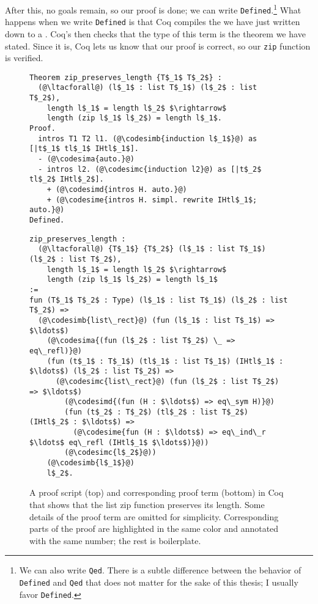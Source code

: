 After this, no goals remain, so our proof is done; we can write \lstinline{Defined}.\footnote{We can also write \lstinline{Qed}. There is a subtle
difference between the behavior of \lstinline{Defined} and \lstinline{Qed} that does not matter for the sake of this thesis; I usually favor \lstinline{Defined}.}
What happens when we write \lstinline{Defined} is that Coq compiles the  we have just written down to a .
Coq's  then checks that the type of this term is the theorem we have stated.
Since it is, Coq lets us know that our proof is correct, so our \lstinline{zip} function is verified.

\begin{figure}
\begin{lstlisting}
Theorem zip_preserves_length {T$_1$ T$_2$} :
  (@\ltacforall@) (l$_1$ : list T$_1$) (l$_2$ : list T$_2$),
    length l$_1$ = length l$_2$ $\rightarrow$
    length (zip l$_1$ l$_2$) = length l$_1$.
Proof.
  intros T1 T2 l1. (@\codesimb{induction l$_1$}@) as [|t$_1$ tl$_1$ IHtl$_1$].
  - (@\codesima{auto.}@)
  - intros l2. (@\codesimc{induction l2}@) as [|t$_2$ tl$_2$ IHtl$_2$].
    + (@\codesimd{intros H. auto.}@)
    + (@\codesime{intros H. simpl. rewrite IHtl$_1$; auto.}@)
Defined.
\end{lstlisting}
\begin{lstlisting}
zip_preserves_length :
  (@\ltacforall@) {T$_1$} {T$_2$} (l$_1$ : list T$_1$) (l$_2$ : list T$_2$),
    length l$_1$ = length l$_2$ $\rightarrow$
    length (zip l$_1$ l$_2$) = length l$_1$
:=
fun (T$_1$ T$_2$ : Type) (l$_1$ : list T$_1$) (l$_2$ : list T$_2$) =>
  (@\codesimb{list\_rect}@) (fun (l$_1$ : list T$_1$) => $\ldots$)
    (@\codesima{(fun (l$_2$ : list T$_2$) \_ => eq\_refl)}@)
    (fun (t$_1$ : T$_1$) (tl$_1$ : list T$_1$) (IHtl$_1$ : $\ldots$) (l$_2$ : list T$_2$) =>
      (@\codesimc{list\_rect}@) (fun (l$_2$ : list T$_2$) => $\ldots$)
        (@\codesimd{(fun (H : $\ldots$) => eq\_sym H)}@)
        (fun (t$_2$ : T$_2$) (tl$_2$ : list T$_2$) (IHtl$_2$ : $\ldots$) =>
          (@\codesime{fun (H : $\ldots$) => eq\_ind\_r $\ldots$ eq\_refl (IHtl$_1$ $\ldots$)}@))
        (@\codesimc{l$_2$}@))
    (@\codesimb{l$_1$}@)
    l$_2$.
\end{lstlisting}
\caption{A proof script (top) and corresponding proof term (bottom) in Coq that shows that the list zip function preserves its length.
Some details of the proof term are omitted for simplicity.
Corresponding parts of the proof are highlighted in the same color and annotated with the same number; the rest is boilerplate.}
\label{fig:zip-proof}
\end{figure}

